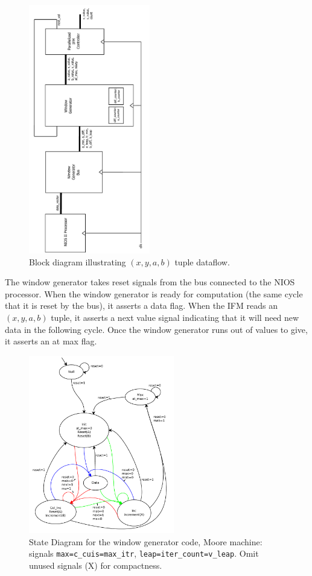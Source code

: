 \documentclass{article}
\begin{document}
\begin{figure}
  \centering
    \includegraphics[width=150pt, angle=270]{block_diagrams/win_gen_interior.pdf}
  \caption{Block diagram illustrating $(x, y, a, b)$ tuple dataflow.}
\end{figure}

The window generator takes reset signals from the bus connected to the NIOS processor. When the window
generator is ready for computation (the same cycle that it is reset by the bus), it asserts a data flag.
When the IFM reads an $(x, y, a, b)$ tuple, it asserts a next value signal indicating that it will need new data in the following cycle. Once the window generator runs out of values to give, it asserts an at max flag.

\begin{figure}
  \centering
    \includegraphics[width=180pt]{state_diagrams/diff_window_gen.pdf}
  \caption{State Diagram for the window generator code, Moore machine:
    signals \texttt{max=c\_cuis=max\_itr},
    \texttt{leap=iter\_count=v\_leap}. Omit unused signals (X) for
    compactness.}
\end{figure}
\end{document}
